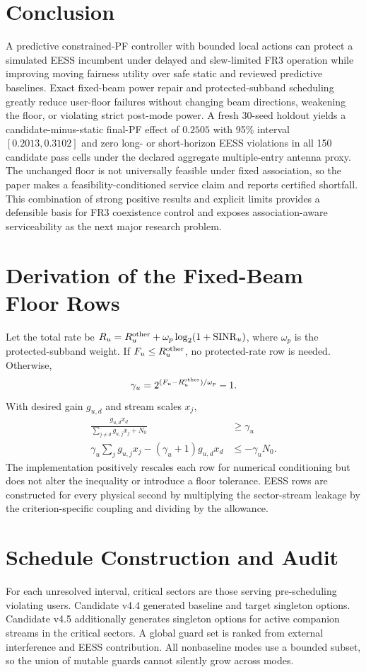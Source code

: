 \documentclass[journal]{IEEEtran}
\begin{document}
\section{Conclusion}
A predictive constrained-PF controller with bounded local actions can protect a simulated EESS incumbent under delayed and slew-limited FR3 operation while improving moving fairness utility over safe static and reviewed predictive baselines. Exact fixed-beam power repair and protected-subband scheduling greatly reduce user-floor failures without changing beam directions, weakening the floor, or violating strict post-mode power. A fresh 30-seed holdout yields a candidate-minus-static final-PF effect of $0.2505$ with 95\% interval $[0.2013,0.3102]$ and zero long- or short-horizon EESS violations in all 150 candidate pass cells under the declared aggregate multiple-entry antenna proxy. The unchanged floor is not universally feasible under fixed association, so the paper makes a feasibility-conditioned service claim and reports certified shortfall. This combination of strong positive results and explicit limits provides a defensible basis for FR3 coexistence control and exposes association-aware serviceability as the next major research problem.


\appendices
\section{Derivation of the Fixed-Beam Floor Rows}
Let the total rate be $R_{u}=R^{\rm other}_{u}+\omega_p\log_2(1+\mathrm{SINR}_{u})$, where $\omega_p$ is the protected-subband weight. If $F_u\le R^{\rm other}_u$, no protected-rate row is needed. Otherwise,
\begin{equation}
 \gamma_u=2^{(F_u-R^{\rm other}_u)/\omega_p}-1.
\end{equation}
With desired gain $g_{u,d}$ and stream scales $x_j$,
\begin{align}
 \frac{g_{u,d}x_d}{\sum_{j\ne d}g_{u,j}x_j+N_0}&\ge\gamma_u\\
 \gamma_u\sum_j g_{u,j}x_j-(\gamma_u+1)g_{u,d}x_d
 &\le-\gamma_u N_0.
\end{align}
The implementation positively rescales each row for numerical conditioning but does not alter the inequality or introduce a floor tolerance. EESS rows are constructed for every physical second by multiplying the sector-stream leakage by the criterion-specific coupling and dividing by the allowance.

\section{Schedule Construction and Audit}
For each unresolved interval, critical sectors are those serving pre-scheduling violating users. Candidate v4.4 generated baseline and target singleton options. Candidate v4.5 additionally generates singleton options for active companion streams in the critical sectors. A global guard set is ranked from external interference and EESS contribution. All nonbaseline modes use a bounded subset, so the union of mutable guards cannot silently grow across modes.
\end{document}
